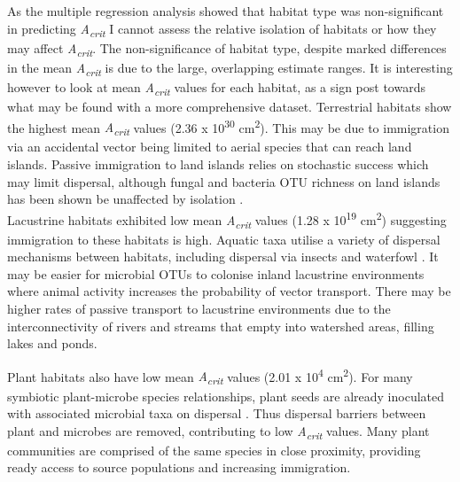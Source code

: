\noindent As the multiple regression analysis showed that habitat type was non-significant in predicting \textit{A\textsubscript{crit}} I cannot assess the relative isolation of habitats or how they may affect \textit{A\textsubscript{crit}}. The non-significance of habitat type, despite marked differences in the mean \textit{A\textsubscript{crit}} is due to the large, overlapping estimate ranges. It is interesting however to look at mean \textit{A\textsubscript{crit}} values for each habitat, as a sign post towards what may be found with a more comprehensive dataset. Terrestrial habitats show the highest mean \textit{A\textsubscript{crit}} values (2.36 x 10\textsuperscript{30} cm\textsuperscript{2}). This may be due to immigration via an accidental vector being limited to aerial species that can reach land islands. Passive immigration to land islands relies on stochastic success which may limit dispersal, although fungal and bacteria OTU richness on land islands has been shown be unaffected by isolation \cite{li2020island}. \\

\noindent Lacustrine habitats exhibited low mean \textit{A\textsubscript{crit}} values (1.28 x 10\textsuperscript{19} cm\textsuperscript{2}) suggesting immigration to these habitats is high. Aquatic taxa utilise a variety of dispersal mechanisms between habitats, including dispersal via insects and waterfowl \cite{stewart1966dispersal}. It may be easier for microbial OTUs to colonise inland lacustrine environments where animal activity increases the probability of vector transport. There may be higher rates of passive transport to lacustrine environments due to the interconnectivity of rivers and streams that empty into watershed areas, filling lakes and ponds.  

\noindent Plant habitats also have low mean \textit{A\textsubscript{crit}} values (2.01 x 10\textsuperscript{4} cm\textsuperscript{2}). For many symbiotic plant-microbe species relationships, plant seeds are already inoculated with associated microbial taxa on dispersal \cite{ho2017plant}. Thus dispersal barriers between plant and microbes are removed, contributing to low \textit{A\textsubscript{crit}} values. Many plant communities are comprised of the same species in close proximity, providing ready access to source populations and increasing immigration. \\

